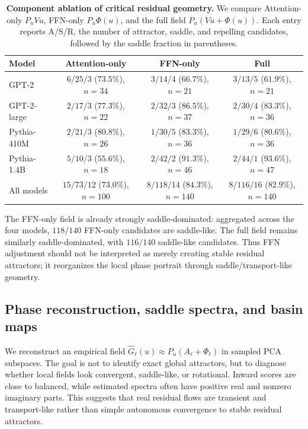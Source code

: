\documentclass[11pt]{article}
\begin{document}
\begin{table}[t]
\centering
\small
\caption{\textbf{Component ablation of critical residual geometry.}
We compare Attention-only $P_uVu$, FFN-only $P_u\Phi(u)$, and the full field
$P_u(Vu+\Phi(u))$.  Each entry reports A/S/R, the number of attractor, saddle,
and repelling candidates, followed by the saddle fraction in parentheses.}
\label{tab:supp-component-ablation-wide}
\begin{tabular}{lccc}
\toprule
Model & Attention-only & FFN-only & Full \\
\midrule
GPT-2
& $6/25/3$ \;($73.5\%$), $n=34$
& $3/14/4$ \;($66.7\%$), $n=21$
& $3/13/5$ \;($61.9\%$), $n=21$ \\
GPT-2-large
& $2/17/3$ \;($77.3\%$), $n=22$
& $2/32/3$ \;($86.5\%$), $n=37$
& $2/30/4$ \;($83.3\%$), $n=36$ \\
Pythia-410M
& $2/21/3$ \;($80.8\%$), $n=26$
& $1/30/5$ \;($83.3\%$), $n=36$
& $1/29/6$ \;($80.6\%$), $n=36$ \\
Pythia-1.4B
& $5/10/3$ \;($55.6\%$), $n=18$
& $2/42/2$ \;($91.3\%$), $n=46$
& $2/44/1$ \;($93.6\%$), $n=47$ \\
\midrule
All models
& $15/73/12$ \;($73.0\%$), $n=100$
& $8/118/14$ \;($84.3\%$), $n=140$
& $8/116/16$ \;($82.9\%$), $n=140$ \\
\bottomrule
\end{tabular}
\end{table}

The FFN-only field is already strongly saddle-dominated: aggregated across the
four models, $118/140$ FFN-only candidates are saddle-like.  The full field
remains similarly saddle-dominated, with $116/140$ saddle-like candidates.  Thus
FFN adjustment should not be interpreted as merely creating stable residual
attractors; it reorganizes the local phase portrait through saddle/transport-like
geometry.

\subsection{Phase reconstruction, saddle spectra, and basin maps}\label{app:phase-saddle}
We reconstruct an empirical field
$\hat G_\ell(u)\approx P_u(A_\ell+\Phi_\ell)$ in sampled PCA subspaces.  The goal
is not to identify exact global attractors, but to diagnose whether local fields
look convergent, saddle-like, or rotational.  Inward scores are close to
balanced, while estimated spectra often have positive real and nonzero imaginary
parts.  This suggests that real residual flows are transient and transport-like
rather than simple autonomous convergence to stable residual attractors.
\end{document}

